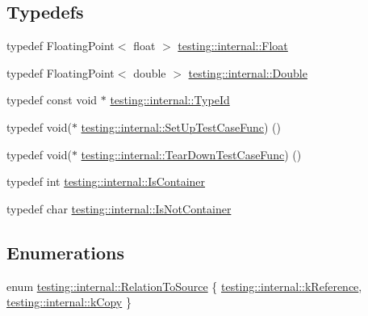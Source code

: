 \subsection*{Typedefs}
\begin{DoxyCompactItemize}
\item 
typedef Floating\+Point$<$ float $>$ \hyperlink{namespacetesting_1_1internal_a02e1981f5ff70609e6ac06e006ff519a}{testing\+::internal\+::\+Float}
\item 
typedef Floating\+Point$<$ double $>$ \hyperlink{namespacetesting_1_1internal_a66a7579b1893b260c31dad577f7a5c48}{testing\+::internal\+::\+Double}
\item 
typedef const void $\ast$ \hyperlink{namespacetesting_1_1internal_ab1114197d3c657d8b7f8e0c5caa12d00}{testing\+::internal\+::\+Type\+Id}
\item 
typedef void($\ast$ \hyperlink{namespacetesting_1_1internal_a30037044c0b57cdd647c7e2e97cb2cff}{testing\+::internal\+::\+Set\+Up\+Test\+Case\+Func}) ()
\item 
typedef void($\ast$ \hyperlink{namespacetesting_1_1internal_a085e31321d0d029c04d2a79234f60c1a}{testing\+::internal\+::\+Tear\+Down\+Test\+Case\+Func}) ()
\item 
typedef int \hyperlink{namespacetesting_1_1internal_ad8f0c2883245f1df2a53618a49f0deb3}{testing\+::internal\+::\+Is\+Container}
\item 
typedef char \hyperlink{namespacetesting_1_1internal_abf080521ce135deb510e0a7830fd3d33}{testing\+::internal\+::\+Is\+Not\+Container}
\end{DoxyCompactItemize}
\subsection*{Enumerations}
\begin{DoxyCompactItemize}
\item 
enum \hyperlink{namespacetesting_1_1internal_aec4f0eeb60b6b8af8dcf979578bbf3bb}{testing\+::internal\+::\+Relation\+To\+Source} \{ \hyperlink{namespacetesting_1_1internal_aec4f0eeb60b6b8af8dcf979578bbf3bba75535e620e7496a433bf008ea81358a1}{testing\+::internal\+::k\+Reference}, 
\hyperlink{namespacetesting_1_1internal_aec4f0eeb60b6b8af8dcf979578bbf3bba272b78aee8068aa2392dbdcf69dfe3a4}{testing\+::internal\+::k\+Copy}
 \}
\end{DoxyCompactItemize}
